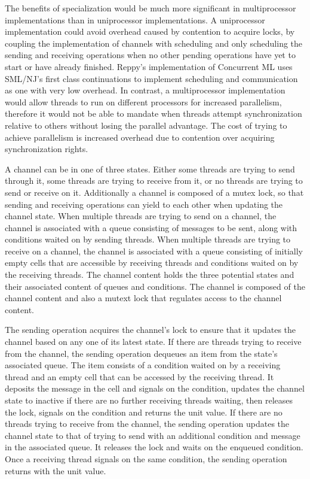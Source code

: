 \documentclass{article}
\begin{document}
The benefits of specialization would be much more significant in multiprocessor
implementations than in uniprocessor implementations. A uniprocessor
implementation could avoid overhead caused by contention to acquire locks, by coupling the
implementation of channels with scheduling and only scheduling the sending and receiving
operations when no other pending operations have yet to start or have already finished.
Reppy's implementation of
Concurrent ML uses SML/NJ's first class continuations to implement scheduling and communication
as one with very low overhead. In contrast, a multiprocessor implementation would allow threads to run
on different processors for increased parallelism, therefore it would not be able to mandate when
threads attempt synchronization relative to others without losing the parallel advantage.
The cost of trying to achieve parallelism is increased overhead due to contention over acquiring
synchronization rights. 

A channel can be in one of three states.  Either some threads are trying to send through it,
some threads are trying to receive from it, or no threads are trying to send or receive on it.
Additionally a channel is composed of a mutex lock, so that sending and receiving operations can yield
to each other when updating the channel state. When multiple threads are trying to send on a
channel, the channel is associated with a queue consisting of messages to be sent, along with
conditions waited on by sending threads. When multiple threads are trying to receive on a
channel, the channel is associated with a queue consisting of initially empty cells that are accessible
by receiving threads and conditions waited on by the receiving threads. The channel content holds the
three potential states and their associated content of queues and conditions.
The channel is composed of the channel content and also a mutext lock that regulates access to
the channel content.

The sending operation acquires the channel's lock to ensure that it updates the channel based on
any one of its latest state.  If there are threads trying to receive from the channel, the sending 
operation dequeues an item from the state's associated queue.  The item consists of a condition
waited on by a receiving thread and an empty cell that can be accessed by the receiving thread.
It deposits the message in the cell and signals on the condition, updates the channel state to
inactive if there are no further receiving threads waiting, then releases the lock, signals on
the condition and returns the unit value.  If there are no threads trying to receive from the
channel, the sending operation updates the channel state to that of trying to send with an
additional condition and message in the associated queue.  It releases the lock and waits on
the enqueued condition.  Once a receiving thread signals on the same condition, the sending 
operation returns with the unit value.
\end{document}
